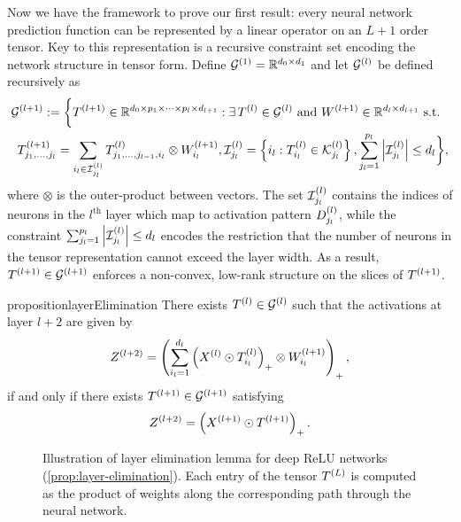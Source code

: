 Now we have the framework to prove our first result:
every neural network prediction function can be represented by a linear
operator on an \( L+1 \) order tensor.
Key to this representation is a recursive constraint set encoding the network
structure in tensor form.
Define \( \mathcal{G}^{(1)} = \mathbb{R}^{d_0 \times d_1} \) and let \( \mathcal{G}^{(l)} \)
be defined recursively as
\begin{equation}\label{eq:rank-tensor-decomp}
    \begin{aligned}
         & \mathcal{G}^{(l+1)}
        := \bigg\{ T^{(l+1)}
        \in \mathbb{R}^{d_{0} \times p_{1} \times \cdots \times p_{l} \times d_{l+1}}
        : \exists \, T^{(l)} \in \mathcal{G}^{(l)}
        \text{ and } W^{(l+1)} \in \mathbb{R}^{d_l \times d_{l+1}} \text{ s.t. } \\
         & \hspace{0.5em} T^{(l+1)}_{j_1, \ldots, j_{l}}
        = \sum_{i_l \in \mathcal{I}^{(l)}_{j_l}} T^{(l)}_{j_1, \ldots, j_{l-1}, i_{l}}
        \otimes W^{(l+1)}_{i_l},
        \mathcal{I}^{(l)}_{j_{l}} = \left\{ i_l : T^{(l)}_{i_l} \in \mathcal{K}^{(l)}_{j_{l}}\right\},
        \sum_{j_l = 1}^{p_l} \left\vert \mathcal{I}^{(l)}_{j_l}\right\vert \leq d_{l}
        \bigg\},
    \end{aligned}
\end{equation}
where \( \otimes \) is the outer-product between vectors.
The set \( \mathcal{I}^{(l)}_{j_l} \) contains the indices of neurons in the
\( l^{\text{th}} \) layer which map to activation pattern \( D^{(l)}_{j_l} \),
while the constraint \( \sum_{j_l=1}^{p_l} \left\vert \mathcal{I}^{(l)}_{j_l}\right\vert \leq d_l \)
encodes the restriction that the number of neurons in the tensor representation
cannot exceed the layer width.
As a result, \( T^{(l+1)} \in \mathcal{G}^{(l+1)} \) enforces a non-convex, low-rank structure
on the slices of \( T^{(l+1)} \).

\begin{restatable}{proposition}{layerElimination}\label{prop:layer-elimination}
    There exists \( T^{(l)} \in \mathcal{G}^{(l)} \) such that
    the activations at layer \( l+2 \) are given by
    \begin{equation}\label{eq:layer-to-tensorize}
        Z^{(l+2)} =
        \left(\sum_{i_l=1}^{d_l} \left(X^{(l)} \odot T^{(l)}_{i_l}\right)_+
            \otimes W^{(l+1)}_{i_l}\right)_+,
    \end{equation}
    if and only if there exists \( T^{(l+1)} \in \mathcal{G}^{(l+1)} \) satisfying
    \[
        Z^{(l+2)} = \left(X^{(l+1)} \odot T^{(l+1)}\right)_+.
    \]
\end{restatable}

\begin{figure}[t]
    \centering
    
    \caption{Illustration of layer elimination lemma for deep ReLU
        networks (\cref{prop:layer-elimination}).
        Each entry of the tensor \( T^{(L)} \) is computed as the
        product of weights along the corresponding path through the neural
        network.}%
    \label{fig:tensor-path}
\end{figure}

